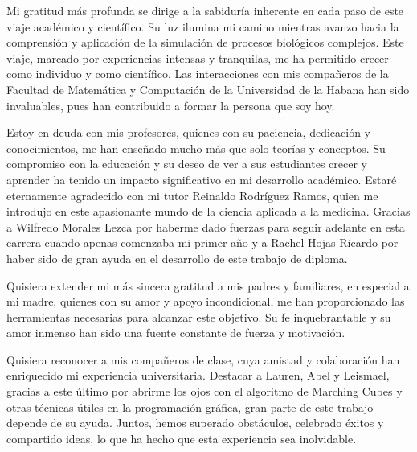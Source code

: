 \begin{acknowledgements}
Mi gratitud más profunda se dirige a la sabiduría inherente en cada paso de este viaje académico y científico. Su luz ilumina mi camino mientras avanzo hacia la comprensión y aplicación de la simulación de procesos biológicos complejos. Este viaje, marcado por experiencias intensas y tranquilas, me ha permitido crecer como individuo y como científico. Las interacciones con mis compañeros de la Facultad de Matemática y Computación de la Universidad de la Habana han sido invaluables, pues han contribuido a formar la persona que soy hoy.



Estoy en deuda con mis profesores, quienes con su paciencia, dedicación y conocimientos, me han enseñado mucho más que solo teorías y conceptos. Su compromiso con la educación y su deseo de ver a sus estudiantes crecer y aprender ha tenido un impacto significativo en mi desarrollo académico. Estar\'e eternamente agradecido con mi tutor Reinaldo Rodríguez Ramos, quien me introdujo en este apasionante mundo de la ciencia aplicada a la medicina. Gracias a Wilfredo Morales Lezca por haberme dado fuerzas para seguir adelante en esta carrera cuando apenas comenzaba mi primer a\~no y a Rachel Hojas Ricardo por haber sido de gran ayuda en el desarrollo de este trabajo de diploma.

Quisiera extender mi más sincera gratitud a mis padres y familiares, en especial a mi madre, quienes con su amor y apoyo incondicional, me han proporcionado las herramientas necesarias para alcanzar este objetivo. Su fe inquebrantable y su amor inmenso han sido una fuente constante de fuerza y motivación.

Quisiera reconocer a mis compañeros de clase, cuya amistad y colaboración han enriquecido mi experiencia universitaria. Destacar a Lauren, Abel y Leismael, gracias a este \'ultimo por abrirme los ojos con el algoritmo de Marching Cubes y otras t\'ecnicas \'utiles en la programación gr\'afica, gran parte de este trabajo depende de su ayuda. Juntos, hemos superado obstáculos, celebrado éxitos y compartido ideas, lo que ha hecho que esta experiencia sea inolvidable.

\end{acknowledgements}